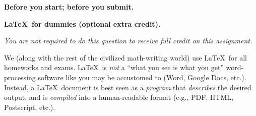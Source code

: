 \documentclass[11pt,addpoints]{exam}
\begin{document}
\hwpreface

\begin{questions}

  \addtocounter{question}{-1}
  \question[0] \textbf{Before you start; before you submit.}
  

  \bonusquestion[10] \textbf{\LaTeX\ for dummies (optional extra credit).} 
  
    \emph{You are not required to do this question to receive full credit on this assignment.}

    We (along with the rest of the civilized math-writing world) use \LaTeX\ for all homeworks and exams.
    \LaTeX\ is \emph{not} a ``what you see is what you get'' word-processing software like you may be accustomed to (Word, Google Docs, etc.).
    Instead, a \LaTeX\ document is best seen as a \emph{program} that \emph{describes} the desired output, and is \emph{compiled} into a human-readable format (e.g., PDF, HTML, Postscript, etc.).
    

\end{questions}
\end{document}
